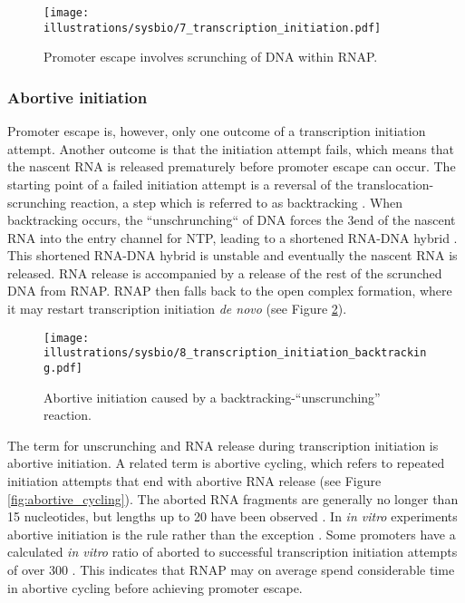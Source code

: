 \begin{figure}[htb]
	\begin{center}
		\texttt{[image: illustrations/sysbio/7\_transcription\_initiation.pdf]}
	\end{center}
	\caption{Promoter escape involves scrunching of DNA within RNAP.}
	\label{fig:simple_escape}
\end{figure}

\subsubsection{Abortive initiation}
Promoter escape is, however, only one outcome of a transcription initiation
attempt. Another outcome is that the initiation attempt fails, which means that
the nascent RNA is released prematurely before promoter escape can occur. The
starting point of a failed initiation attempt is a reversal of the
translocation-scrunching reaction, a step which is referred to as backtracking
\cite{hsu_initial_2006}. When backtracking occurs, the ``unschrunching`` of
DNA forces the 3\ppp end of the nascent RNA into the entry channel for NTP,
leading to a shortened RNA-DNA hybrid \cite{hsu_initial_2006}. This shortened
RNA-DNA hybrid is unstable and eventually the nascent RNA is released. RNA
release is accompanied by a release of the rest of the scrunched DNA from RNAP.
RNAP then falls back to the open complex formation, where it may restart
transcription initiation \textit{de novo} \cite{lilian_m_promoter_2002} (see
Figure \ref{fig:abortive_backtrack}).

\begin{figure}[htb]
	\begin{center}
		\texttt{[image: illustrations/sysbio/8\_transcription\_initiation\_backtracking.pdf]}
	\end{center}
	\caption{Abortive initiation caused by a backtracking-``unscrunching''
	reaction.}
	\label{fig:abortive_backtrack}
\end{figure}

The term for unscrunching and RNA release during transcription initiation is
abortive initiation. A related term is abortive cycling, which refers to
repeated initiation attempts that end with abortive RNA release (see Figure
\ref{fig:abortive_cycling}). The aborted RNA fragments are generally no longer
than 15 nucleotides, but lengths up to 20 have been observed
\cite{chander_alternate_2007}. In \textit{in vitro} experiments abortive
initiation is the rule rather than the exception \cite{lilian_m_promoter_2002}.
Some promoters have a calculated \textit{in vitro} ratio of aborted to
successful transcription initiation attempts of over 300
\cite{hsu_initial_2006}. This indicates that RNAP may on average spend
considerable time in abortive cycling before achieving promoter escape.

